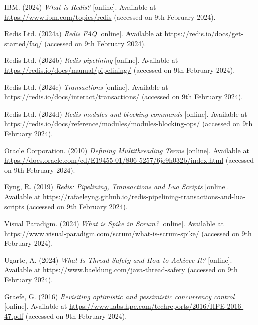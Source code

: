 \noindent IBM. (2024) \textit{What is Redis?} [online]. Available at \url{https://www.ibm.com/topics/redis} (accessed on 9th February 2024).
\vspace{0.2cm}

\noindent Redis Ltd. (2024a) \textit{Redis FAQ} [online]. Available at \url{https://redis.io/docs/get-started/faq/} (accessed on 9th February 2024).
\vspace{0.2cm}

\noindent Redis Ltd. (2024b) \textit{Redis pipelining} [online]. Available at \url{https://redis.io/docs/manual/pipelining/} (accessed on 9th February 2024).
\vspace{0.2cm}

\noindent Redis Ltd. (2024c) \textit{Transactions} [online]. Available at \url{https://redis.io/docs/interact/transactions/} (accessed on 9th February 2024).
\vspace{0.2cm}

\noindent Redis Ltd. (2024d) \textit{Redis modules and blocking commands} [online]. Available at \url{https://redis.io/docs/reference/modules/modules-blocking-ops/} (accessed on 9th February 2024).
\vspace{0.2cm}

\noindent Oracle Corporation. (2010) \textit{Defining Multithreading Terms} [online]. Available at \url{https://docs.oracle.com/cd/E19455-01/806-5257/6je9h032b/index.html} (accessed on 9th February 2024).
\vspace{0.2cm}

\noindent Eyng, R. (2019) \textit{Redis: Pipelining, Transactions and Lua Scripts} [online]. Available at \url{https://rafaeleyng.github.io/redis-pipelining-transactions-and-lua-scripts} (accessed on 9th February 2024).
\vspace{0.2cm}

\noindent Visual Paradigm. (2024) \textit{What is Spike in Scrum?} [online]. Available at \url{https://www.visual-paradigm.com/scrum/what-is-scrum-spike/} (accessed on 9th February 2024).
\vspace{0.2cm}

\noindent Ugarte, A. (2024) \textit{What Is Thread-Safety and How to Achieve It?} [online]. Available at \url{https://www.baeldung.com/java-thread-safety} (accessed on 9th February 2024).
\vspace{0.2cm}

\noindent Graefe, G. (2016) \textit{Revisiting optimistic and pessimistic concurrency control} [online]. Available at \url{https://www.labs.hpe.com/techreports/2016/HPE-2016-47.pdf} (accessed on 9th February 2024).
\vspace{0.2cm}


